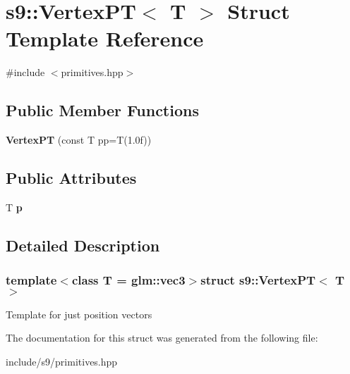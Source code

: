 \hypertarget{structs9_1_1VertexPT}{\section{s9\-:\-:\-Vertex\-P\-T$<$ \-T $>$ \-Struct \-Template \-Reference}
\label{structs9_1_1VertexPT}
}


{\ttfamily \#include $<$primitives.\-hpp$>$}

\subsection*{\-Public \-Member \-Functions}
\begin{DoxyCompactItemize}
\item 
\hypertarget{structs9_1_1VertexPT_ab82b6b68abdb878d607802c3a3dd712b}{{\bfseries \-Vertex\-P\-T} (const \-T pp=\-T(1.\-0f))}\label{structs9_1_1VertexPT_ab82b6b68abdb878d607802c3a3dd712b}

\end{DoxyCompactItemize}
\subsection*{\-Public \-Attributes}
\begin{DoxyCompactItemize}
\item 
\hypertarget{structs9_1_1VertexPT_ab901fbd71923d60b2165cb893d5e17bb}{\-T {\bfseries p}}\label{structs9_1_1VertexPT_ab901fbd71923d60b2165cb893d5e17bb}

\end{DoxyCompactItemize}


\subsection{\-Detailed \-Description}
\subsubsection*{template$<$class T = glm\-::vec3$>$struct s9\-::\-Vertex\-P\-T$<$ T $>$}

\-Template for just position vectors 

\-The documentation for this struct was generated from the following file\-:\begin{DoxyCompactItemize}
\item 
include/s9/primitives.\-hpp\end{DoxyCompactItemize}
